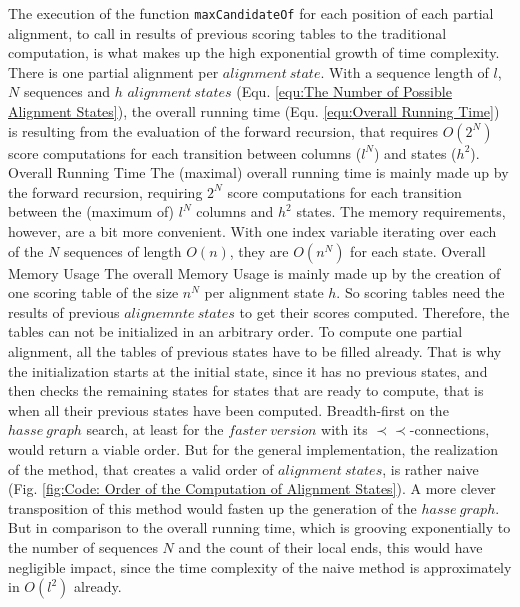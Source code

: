 \documentclass[a4paper,10pt]{thesis}
\newcommand{\pprec}{\mathrel{\prec\!\!\!\!\prec}}
\begin{document}
{{{{        %
        The execution of the function \texttt{maxCandidateOf} for each position of each partial alignment, to call in results of previous scoring tables to the traditional computation, is what makes up the high exponential growth of time complexity. There is one partial alignment per $alignment~state$. With a sequence length of $l$, $N$ sequences and $h$ $alignment~states$ (Equ. \ref{equ:The Number of Possible Alignment States}), the overall running time (Equ. \ref{equ:Overall Running Time}) is resulting from the evaluation of the forward recursion, that requires $O(2^N)$ score computations for each transition between columns ($l^N$) and states ($h^2$). 
        {Overall Running Time}
        {The (maximal) overall running time is mainly made up by the forward recursion, requiring $2^N$ score computations for each transition between the (maximum of) $l^N$ columns and $h^2$ states.}%
        The memory requirements, however, are a bit more convenient. With one index variable iterating over each of the $N$ sequences of length $O(n)$, they are $O(n^N)$ for each state.
        {Overall Memory Usage}
        {The overall Memory Usage is mainly made up by the creation of one scoring table of the size $n^N$ per alignment state $h$.}%
        So scoring tables need the results of previous $alignemnte~states$ to get their scores computed. Therefore, the tables can not be initialized in an arbitrary order. To compute one partial alignment, all the tables of previous states have to be filled already. That is why the initialization starts at the initial state, since it has no previous states, and then checks the remaining states for states that are ready to compute, that is when all their previous states have been computed. Breadth-first on the $hasse~graph$ search, at least for the $faster~version$ with its $\pprec$-connections, would return a viable order. But for the general implementation, the realization of the method, that creates a valid order of $alignment~states$, is rather naive (Fig. \ref{fig:Code: Order of the Computation of Alignment States}).
        \gapSmall
        A more clever transposition of this method would fasten up the generation of the $hasse~graph$. But in comparison to the overall running time, which is grooving exponentially to the number of sequences $N$ and the count of their local ends, this would have negligible impact, since the time complexity of the naive method is approximately in $O(l^2)$ already.
      }
    }
    }}
\end{document}
